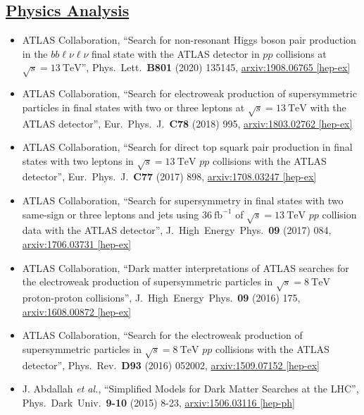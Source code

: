 \documentclass[a4paper,10pt]{article}
\begin{document}
\subsection{\underline{Physics Analysis}}
\vspace{1mm}
\begin{itemize}
	\item ATLAS Collaboration,
	``Search for non-resonant Higgs boson pair production in the $bb\ell\nu\ell\nu$ final state with the ATLAS detector in $pp$ collisions at $\sqrt{s}=13\ \mathrm{TeV}$'',
	Phys.\ Lett.\ {\bf B801} (2020) 135145,
	\href{https://arxiv.org/abs/1908.06765}{arxiv:1908.06765 [hep-ex]}
	\item ATLAS Collaboration,
	``Search for electroweak production of supersymmetric particles in final states with two or three leptons at $\sqrt{s}=13\ \mathrm{TeV}$ with the ATLAS detector'',
	Eur.\ Phys.\ J.\ {\bf C78} (2018) 995,
	\href{https://arxiv.org/abs/1803.02762}{arxiv:1803.02762 [hep-ex]}	
	\item ATLAS Collaboration,
	``Search for direct top squark pair production in final states with two leptons in $\sqrt{s}=13\ \mathrm{TeV}$ $pp$ collisions with the ATLAS detector'',
	Eur.\ Phys.\ J.\ {\bf C77} (2017) 898,
	\href{https://arxiv.org/abs/1708.03247}{arxiv:1708.03247 [hep-ex]}
	\item ATLAS Collaboration,
	``Search for supersymmetry in final states with two same-sign or three leptons and jets using $36\ \mathrm{fb}^{-1}$ of $\sqrt{s}=13\ \mathrm{TeV}$ $pp$ collision data with the ATLAS detector'',
	J.\ High\ Energy\ Phys.\ {\bf 09} (2017) 084,
	\href{https://arxiv.org/abs/1706.03731}{arxiv:1706.03731 [hep-ex]}
	\item ATLAS Collaboration,
	``Dark matter interpretations of ATLAS searches for the electroweak production of supersymmetric particles in $\sqrt{s} = 8\ \mathrm{TeV}$ proton-proton collisions'',
	J.\ High\ Energy\ Phys.\ {\bf 09} (2016) 175,
	\href{http://arxiv.org/abs/1608.00872}{arxiv:1608.00872 [hep-ex]}
	\item ATLAS Collaboration,
	``Search for the electroweak production of supersymmetric particles in $\sqrt{s} = 8\ \mathrm{TeV}$ $pp$ collisions with the ATLAS detector'',
	Phys.\ Rev.\ {\bf D93} (2016) 052002,
	\href{http://arxiv.org/abs/1509.07152}{arxiv:1509.07152 [hep-ex]}
	\item J. Abdallah {\it et al.},
	``Simplified Models for Dark Matter Searches at the LHC'',
	Phys.\ Dark\ Univ.\ {\bf 9-10} (2015) 8-23,
	\href{http://arxiv.org/abs/1506.03116}{arxiv:1506.03116 [hep-ph]}

\end{itemize}
\end{document}
